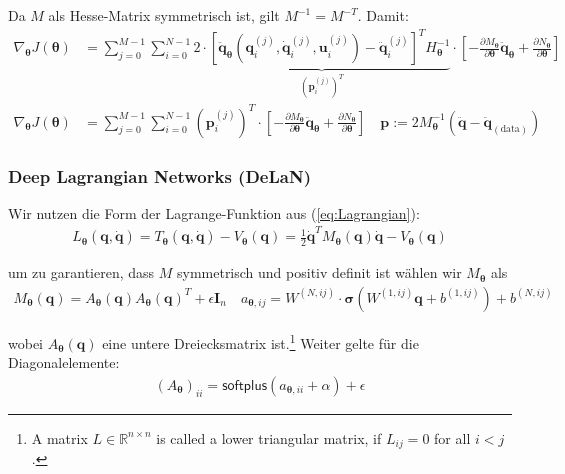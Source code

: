 \documentclass[a4paper, 12pt]{scrartcl}
\begin{document}
Da $M$ als Hesse-Matrix symmetrisch ist, gilt $M^{-1} = M^{-T}$. Damit: 
\begin{align*}
    \nabla_{\bm{\theta}} J(\bm{\theta})
    &=
    \sum_{j=0}^{M-1} \sum_{i=0}^{N-1} 
    \underbrace{
        2 \cdot
        \left[
            \bm{\ddot{q}}_{\bm{\theta}}
            (\bm{q}_i^{(j)},\bm{\dot{q}}_i^{(j)},\bm{u}_i^{(j)}) 
            - 
            \bm{\ddot{q}}^{(j)}_{i}
        \right]^T
    H_{\bm{\theta}}^{-1}
    }_{\left(\bm{p}_i^{(j)}\right)^T}
    \cdot
    \left[
        - \frac{\partial M_{\bm{\theta}}}{\partial \bm{\theta}}
        \bm{\ddot{q}_{\theta}}
        +
        \frac{\partial N_{\bm{\theta}}}{\partial \bm{\theta}}
    \right]
    \\
    \nabla_{\bm{\theta}} J(\bm{\theta})
    &=
    \sum_{j=0}^{M-1} \sum_{i=0}^{N-1} \left(\bm{p}_i^{(j)}\right)^T 
    \cdot
    \left[
        - \frac{\partial M_{\bm{\theta}}}{\partial \bm{\theta}}
        \bm{\ddot{q}_{\theta}}
        +
        \frac{\partial N_{\bm{\theta}}}{\partial \bm{\theta}}
    \right]
    \quad
    \bm{p} := 2M^{-1}_{\bm{\theta}} 
    \left(
        \bm{\ddot{q}} - \bm{\ddot{q}}_{(\text{data})}
    \right)
\end{align*}


\subsubsection{Deep Lagrangian Networks (DeLaN)}

Wir nutzen die Form der Lagrange-Funktion aus (\ref{eq:Lagrangian}):
%
\begin{align*}
    L_{\bm{\theta}}(\bm{q}, \bm{\dot{q}})
    =
    T_{\bm{\theta}}(\bm{q}, \bm{\dot{q}})
    -
    V_{\bm{\theta}}(\bm{q})
    =
    \frac{1}{2} \bm{\dot{q}}^T M_{\bm{\theta}}(\bm{q}) \bm{\dot{q}} 
    -
    V_{\bm{\theta}}(\bm{q})
\end{align*}

um zu garantieren, dass $M$ symmetrisch und positiv definit ist wählen wir $M_{\bm{\theta}}$
als
%
\begin{align}\label{def:NN_M}
    M_{\bm{\theta}}(\bm{q})
    =
    A_{\bm{\theta}}(\bm{q}) A_{\bm{\theta}}(\bm{q})^T
    + \epsilon \bm{I}_n
    \quad
    a_{\bm{\theta},ij}
    =
    W^{(N, ij)} \cdot \bm{\sigma}\left(W^{(1,ij)} \bm{q} + b^{(1,ij)}\right) + b^{(N,ij)}
\end{align}

wobei $A_{\bm{\theta}}(\bm{q})$ eine untere Dreiecksmatrix ist.\footnote{
    A matrix $L \in \mathbb{R}^{n \times n}$ is called a lower triangular matrix, 
    if $L_{ij} = 0$ for all $i < j$.
} 
Weiter gelte für die Diagonalelemente:
%
\begin{align*}
    (A_{\bm{\theta}})_{ii} = \mathsf{softplus}\left(a_{\bm{\theta},ii} + \alpha \right) + \epsilon
\end{align*}
\end{document}
